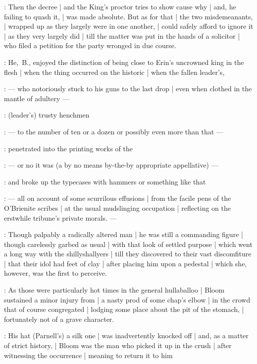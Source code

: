 :
Then the decree  |
and the King's proctor tries to show cause why |
and, he failing to quash it, |
 was made absolute.
But as for that |
the two misdemeanants, |
wrapped up as they largely were in one another, |
could safely afford to ignore it |
as they very largely did |
till the matter was put in the hands of a solicitor |
who filed a petition for the party wronged in due course.

:
He,~B., enjoyed the distinction of being close
to Erin's uncrowned king in the flesh |
when the thing occurred on the historic  |
when the fallen leader's,

:
    --- who notoriously stuck to his guns to the last drop |
        even when clothed in the mantle of adultery ---

:
(leader's) trusty henchmen

:
    --- to the number of ten or a dozen or possibly even more than that ---

:
penetrated into the printing works of the 

:
    --- or no it was 
        (a by no means by-the-by appropriate appellative) ---

:
and broke up the typecases with hammers or something like that

:
    --- all on account of some scurrilous effusions |
        from the facile pens of the O'Brienite scribes |
        at the usual mudslinging occupation |
        reflecting on the erstwhile tribune's private morals. ---

:
Though palpably a radically altered man |
he was still a commanding figure |
though carelessly garbed as usual |
with that look of settled purpose |
which went a long way with the shillyshallyers |
till they discovered to their vast discomfiture |
that their idol had feet of clay |
after placing him upon a pedestal |
which she, however, was the first to perceive.

:
As those were particularly hot times in the general hullaballoo |
Bloom sustained a minor injury from |
a nasty prod of some chap's elbow |
in the crowd that of course congregated |
lodging some place about the pit of the stomach, |
fortunately not of a grave character.

:
His hat (Parnell's) a silk one |
was inadvertently knocked off |
and, as a matter of strict history, |
Bloom was the man who picked it up in the crush |
after witnessing the occurrence |
meaning to return it to him

